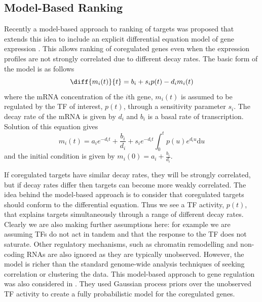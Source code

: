 \documentclass{article}
\begin{document}
\subsection{Model-Based Ranking}

Recently a  model-based  approach to ranking  of targets  was proposed
that extends  this idea to  include an explicit  differential equation
model  of   gene  expression  \cite{Barenco:ranked06}. This  allows
ranking of coregulated genes even when the expression profiles are not
strongly  correlated due to different decay  rates. The  basic form  of the
model is as follows
\begin{equation}
  \diff{m_i(t)}{t} = b_i + s_i p(t) - d_i m_i(t)
\end{equation}
where the mRNA concentration of the $i$th gene, $m_i(t)$ is assumed to
be  regulated by  the TF  of interest,  $p(t)$, through  a sensitivity
parameter $s_i$.  The decay  rate of  the mRNA is  given by  $d_i$ and
$b_i$  is a  basal rate  of transcription.  Solution of  this equation
gives
\begin{equation}
  m_i(t) = a_i e^{-d_it} + \frac{b_i}{d_i} + s_i
  e^{-d_it}\int_0^tp(u)e^{d_i u}\mathrm{d} u \label{eq:linearOperator}
\end{equation}
and the initial condition is given by $m_i(0)=a_i + \frac{b_i}{d_i}$. 

If coregulated targets have similar decay rates, they will be strongly
correlated, but  if decay  rates differ then  targets can  become more
weakly correlated.  The  idea behind the model-based  approach is to
consider that  coregulated targets should conform  to the differential
equation. Thus  we see  a TF activity,  $p(t)$, that  explains targets
simultaneously through  a range of different decay  rates.  Clearly we
are also making further assumptions  here: for example we are assuming
TFs  do not act  in tandem  and  that the  response to  the TF  does not
saturate. Other regulatory mechanisms, such as chromatin remodelling
and non-coding RNAs are also ignored as they are typically unobserved.
However,  the model is richer than  the standard genome-wide
analysis   techniques  of  seeking   correlation  or   clustering  the
data. This model-based approach to gene regulation was also considered
in  \cite{Gao:latent08}. They  used Gaussian  process priors  over the
unobserved TF activity  to create a fully probabilistic  model for the
coregulated genes.
\end{document}
